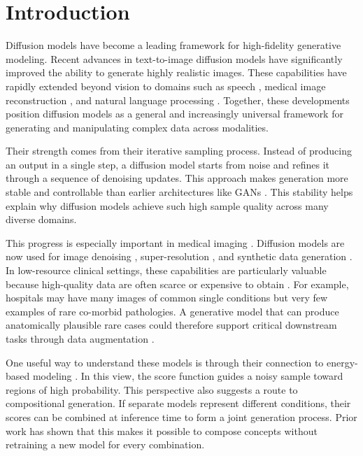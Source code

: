 
\chapter{Introduction}
\label{chap:introduction}

Diffusion models \citep{song2021train,NEURIPS2020_4c5bcfec} have become a leading framework for high-fidelity generative modeling.
Recent advances \citep{rombach2022high, BetkerImprovingIG} in text-to-image diffusion models have significantly improved the ability to generate highly realistic images.
These capabilities have rapidly extended beyond vision to domains such as speech \citep{chen2020wavegrad}, medical image reconstruction \citep{metal_inpainting_cbct_projections, high_frequency_space_diffusion_model}, and natural language processing \citep{structured_denoising,diffusion_lm, argmax_flows}.
Together, these developments position diffusion models as a general and increasingly universal framework for generating and manipulating complex data across modalities.

Their strength comes from their iterative sampling process. 
Instead of producing an output in a single step, a diffusion model starts from noise and refines it through a sequence of denoising updates. 
This approach makes generation more stable and controllable than earlier architectures like GANs \citep{NIPS2014_f033ed80}. 
This stability helps explain why diffusion models achieve such high sample quality across many diverse domains.

This progress is especially important in medical imaging \citep{metal_inpainting_cbct_projections, high_frequency_space_diffusion_model}. 
Diffusion models are now used for image denoising \citep{NEURIPS2020_4c5bcfec}, super-resolution \citep{superresolution_via_iterative_refinement}, and synthetic data generation \citep{rombach2022high}. 
In low-resource clinical settings, these capabilities are particularly valuable because high-quality data are often scarce or expensive to obtain \citep{GROGER2025100220, Nyamawe2026OnTU}. 
For example, hospitals may have many images of common single conditions but very few examples of rare co-morbid pathologies.
A generative model that can produce anatomically plausible rare cases could therefore support critical downstream tasks through data augmentation \citep{HOLSTE2024103224}.

One useful way to understand these models is through their connection to energy-based modeling \citep{LeCun2006ATO}. 
In this view, the score function guides a noisy sample toward regions of high probability. 
This perspective also suggests a route to compositional generation. 
If separate models represent different conditions, their scores can be combined at inference time to form a joint generation process. 
Prior work \citep{du2023reduce,du2024compositional,skreta2024superposition, NEURIPS2020_49856ed4} has shown that this makes it possible to compose concepts without retraining a new model for every combination.

